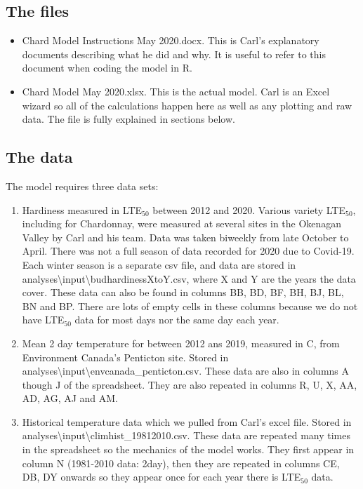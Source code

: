 \documentclass[11pt,letter]{article}
\begin{document}
\subsection{The files}
\begin{itemize}
	\item Chard Model Instructions May 2020.docx. This is Carl's explanatory documents describing what he did and why. It is useful to refer to this document when coding the model in R. 
	\item Chard Model May 2020.xlsx. This is the actual model. Carl is an Excel wizard so all of the calculations happen here as well as any plotting and raw data. The file is fully explained in sections below.
\end{itemize}

\subsection{The data}

The model requires three data sets: 
\begin{enumerate}
	\item Hardiness measured in LTE$_{50}$ between 2012 and 2020. Various variety LTE${_50}$, including for Chardonnay, were measured at several sites in the Okenagan Valley by Carl and his team. Data was taken biweekly from late October to April. There was not a full season of data recorded for 2020 due to Covid-19. Each winter season is a separate csv file, and data are stored in analyses\textbackslash input\textbackslash budhardinessXtoY.csv, where X and Y are the years the data cover. These data can also be found in columns BB, BD, BF, BH, BJ, BL, BN and BP. There are lots of empty cells in these columns because we do not have LTE$_{50}$ data for most days nor the same day each year. 

	\item Mean 2 day temperature for between 2012 ans 2019, measured in \textdegree{}C, from Environment Canada's Penticton site. Stored in analyses\textbackslash input\textbackslash envcanada\_penticton.csv. These data are also in columns A though J of the spreadsheet. They are also repeated in columns R, U, X, AA, AD, AG, AJ and AM. 

	\item Historical temperature data which we pulled from Carl's excel file. Stored in analyses\textbackslash input\textbackslash climhist\_19812010.csv. These data are repeated many times in the spreadsheet so the mechanics of the model works. They first appear in column N (1981-2010 data: 2day), then they are repeated in columns CE, DB, DY onwards so they appear once for each year there is LTE$_{50}$ data.   

\end{enumerate}
\end{document}
